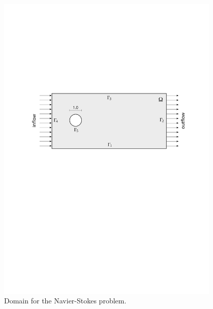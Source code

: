 \begin{figure}[b]
  \medskip \centering
  \includegraphics[width=0.95\textwidth]{img/cylinder}
  \caption{Domain for the Navier-Stokes problem.}
  \label{cylinderdomain}
\end{figure}

